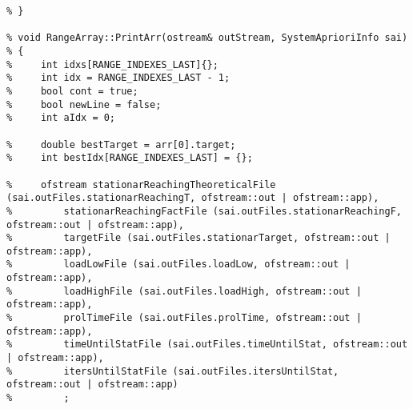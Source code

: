 \begin{lstlisting}[language={[ISO]C++}]
%     return true;
% }

% void RangeArray::PrintArr(ostream& outStream, SystemAprioriInfo sai)
% {
%     int idxs[RANGE_INDEXES_LAST]{};
%     int idx = RANGE_INDEXES_LAST - 1;
%     bool cont = true;
%     bool newLine = false;
%     int aIdx = 0;

%     double bestTarget = arr[0].target;
%     int bestIdx[RANGE_INDEXES_LAST] = {};
    
%     ofstream stationarReachingTheoreticalFile (sai.outFiles.stationarReachingT, ofstream::out | ofstream::app),
%         stationarReachingFactFile (sai.outFiles.stationarReachingF, ofstream::out | ofstream::app),
%         targetFile (sai.outFiles.stationarTarget, ofstream::out | ofstream::app),
%         loadLowFile (sai.outFiles.loadLow, ofstream::out | ofstream::app),
%         loadHighFile (sai.outFiles.loadHigh, ofstream::out | ofstream::app),
%         prolTimeFile (sai.outFiles.prolTime, ofstream::out | ofstream::app),
%         timeUntilStatFile (sai.outFiles.timeUntilStat, ofstream::out | ofstream::app),
%         itersUntilStatFile (sai.outFiles.itersUntilStat, ofstream::out | ofstream::app)
%         ;


\end{lstlisting}
